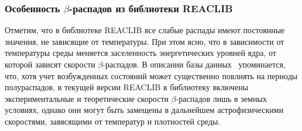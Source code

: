 \subsubsection{Особенность $\beta$-распадов из библиотеки REACLIB}
  Отметим, что в библиотеке REACLIB все слабые распады имеют постоянные значения, не зависящие от температуры. При этом ясно, что в зависимости от температуры среды меняется заселенность энергетических уровней ядра, от которой зависят скорости $\beta$-распадов. В описании базы данных~\cite{reaclib2010} упоминается, что, хотя учет возбужденных состояний может существенно повлиять на периоды полураспадов, в текущей версии REACLIB в библиотеку включены экспериментальные и теоретические скорости $\beta$-распадов лишь в земных условиях, однако они могут быть замещены в дальнейшем астрофизическими скоростями, завясящими от температур и плотностей среды.
